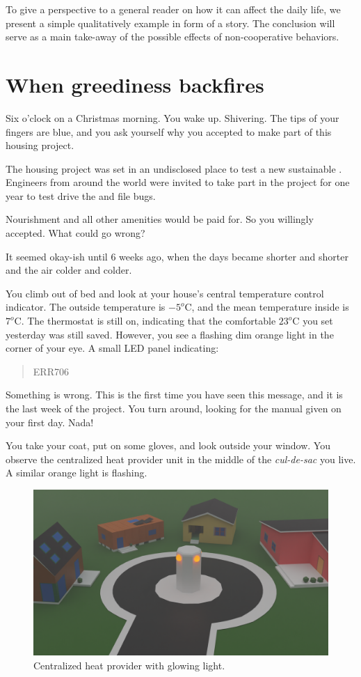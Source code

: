 \documentclass[../main.tex]{subfiles}
\begin{document}
To give a perspective to a general reader on how it can affect the daily life, we present a simple qualitatively example in form of a story. The conclusion will serve as a main take-away of the possible effects of non-cooperative behaviors.
\newpage
\section{When greediness backfires}
Six o'clock on a Christmas morning.
You wake up.
Shivering.
The tips of your fingers are blue, and you ask yourself why you accepted to make part of this housing project.

The housing project was set in an undisclosed place to test a new sustainable \dhn{}.
Engineers from around the world were invited to take part in the project for one year to test drive the \dhn{} and file bugs.

Nourishment and all other amenities would be paid for.
So you willingly accepted.
What could go wrong?

It seemed okay-ish until $6$ weeks ago, when the days became shorter and shorter and the air colder and colder.

You climb out of bed and look at your house's central temperature control indicator. The outside temperature is $-5^{o}$C, and the mean temperature inside is $7^{o}$C.
The thermostat is still on, indicating that the comfortable $23^{o}$C you set yesterday was still saved. However, you see a flashing dim orange light in the corner of your eye. A small LED panel indicating:
\begin{quote}
ERR706
\end{quote}

Something is wrong.
This is the first time you have seen this message, and it is the last week of the project.
You turn around, looking for the manual given on your first day. Nada!

You take your coat, put on some gloves, and look outside your window.
You observe the centralized heat provider unit in the middle of the \emph{cul-de-sac} you live.
\\A similar orange light is flashing.
\begin{figure}[H]
  \centering
  \includegraphics[width=.75\textwidth]{../img/district_3d.png}
  \caption{Centralized heat provider with glowing light.}\label{fig:culdesac}
\end{figure}
\end{document}
